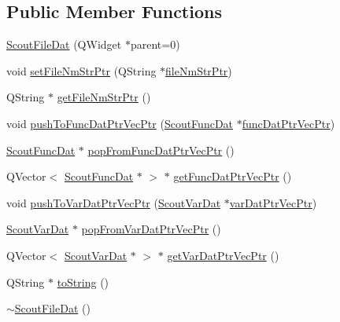 \subsection*{Public Member Functions}
\begin{DoxyCompactItemize}
\item 
\hyperlink{class_scout_file_dat_a07e2114b6e2a85a214018a27fb9a170c}{Scout\-File\-Dat} (Q\-Widget $\ast$parent=0)
\item 
void \hyperlink{class_scout_file_dat_aa47a4b0ca2ee36216d0738f074664d10}{set\-File\-Nm\-Str\-Ptr} (Q\-String $\ast$\hyperlink{class_scout_file_dat_af7353d56bff3ddad52115fd5ecd3dba9}{file\-Nm\-Str\-Ptr})
\item 
Q\-String $\ast$ \hyperlink{class_scout_file_dat_ac293c392624177c2adc1ae5c6bd669f8}{get\-File\-Nm\-Str\-Ptr} ()
\item 
void \hyperlink{class_scout_file_dat_ae91be34ff12cdff637f35e54177bf514}{push\-To\-Func\-Dat\-Ptr\-Vec\-Ptr} (\hyperlink{class_scout_func_dat}{Scout\-Func\-Dat} $\ast$\hyperlink{class_scout_file_dat_a644c1c18aa490f37e4921a942daabfe3}{func\-Dat\-Ptr\-Vec\-Ptr})
\item 
\hyperlink{class_scout_func_dat}{Scout\-Func\-Dat} $\ast$ \hyperlink{class_scout_file_dat_af5acff6058ba9d10239914e7c5bd1de0}{pop\-From\-Func\-Dat\-Ptr\-Vec\-Ptr} ()
\item 
Q\-Vector$<$ \hyperlink{class_scout_func_dat}{Scout\-Func\-Dat} $\ast$ $>$ $\ast$ \hyperlink{class_scout_file_dat_a6c7292c3f13a026a10073adcd7705883}{get\-Func\-Dat\-Ptr\-Vec\-Ptr} ()
\item 
void \hyperlink{class_scout_file_dat_a89f9120e9794ff0021d98ba44ca32dc0}{push\-To\-Var\-Dat\-Ptr\-Vec\-Ptr} (\hyperlink{class_scout_var_dat}{Scout\-Var\-Dat} $\ast$\hyperlink{class_scout_file_dat_af97f5079999e27f0fcb8ff34e168b656}{var\-Dat\-Ptr\-Vec\-Ptr})
\item 
\hyperlink{class_scout_var_dat}{Scout\-Var\-Dat} $\ast$ \hyperlink{class_scout_file_dat_aeb555fc115ec066769023f8c4a4c1087}{pop\-From\-Var\-Dat\-Ptr\-Vec\-Ptr} ()
\item 
Q\-Vector$<$ \hyperlink{class_scout_var_dat}{Scout\-Var\-Dat} $\ast$ $>$ $\ast$ \hyperlink{class_scout_file_dat_a37c127a61c302008cf840d6fa7e02b2a}{get\-Var\-Dat\-Ptr\-Vec\-Ptr} ()
\item 
Q\-String $\ast$ \hyperlink{class_scout_file_dat_ad4cebd5ce894cd19448c63db847ca199}{to\-String} ()
\item 
\hyperlink{class_scout_file_dat_a88ccce70e4cdbadcb86d75e3c0b8255e}{$\sim$\-Scout\-File\-Dat} ()
\end{DoxyCompactItemize}
